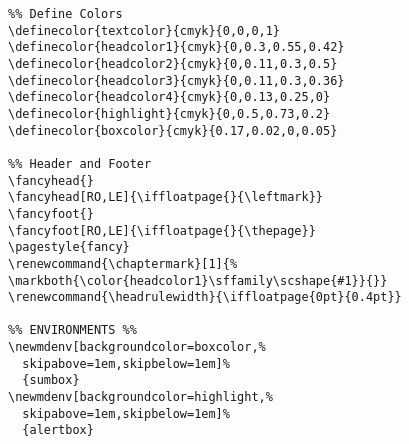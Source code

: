 \documentclass[english,10pt,bbook=pocketbig,inner=1cm,outer=2.5cm]{npblurb}
\begin{document}
\begin{Verbatim}
%% Define Colors
\definecolor{textcolor}{cmyk}{0,0,0,1}
\definecolor{headcolor1}{cmyk}{0,0.3,0.55,0.42}
\definecolor{headcolor2}{cmyk}{0,0.11,0.3,0.5}
\definecolor{headcolor3}{cmyk}{0,0.11,0.3,0.36}
\definecolor{headcolor4}{cmyk}{0,0.13,0.25,0}
\definecolor{highlight}{cmyk}{0,0.5,0.73,0.2}
\definecolor{boxcolor}{cmyk}{0.17,0.02,0,0.05}

%% Header and Footer
\fancyhead{}
\fancyhead[RO,LE]{\iffloatpage{}{\leftmark}}
\fancyfoot{}
\fancyfoot[RO,LE]{\iffloatpage{}{\thepage}}
\pagestyle{fancy}
\renewcommand{\chaptermark}[1]{% 
\markboth{\color{headcolor1}\sffamily\scshape{#1}}{}}
\renewcommand{\headrulewidth}{\iffloatpage{0pt}{0.4pt}}

%% ENVIRONMENTS %%
\newmdenv[backgroundcolor=boxcolor,%
  skipabove=1em,skipbelow=1em]%
  {sumbox}
\newmdenv[backgroundcolor=highlight,%
  skipabove=1em,skipbelow=1em]%
  {alertbox}

\end{Verbatim}
\end{document}
